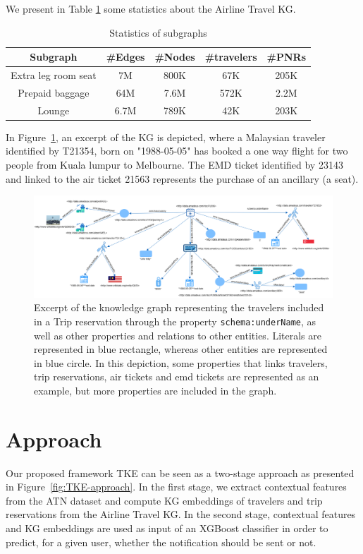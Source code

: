 \documentclass[11pt,dvipdfm]{article}
\begin{document}
We present in Table \ref{tab:subgraphs} some statistics about the Airline Travel KG. 
\begin{table}[htbp]
  \centering
  \caption{Statistics of subgraphs}
  \label{tab:subgraphs}
  \footnotesize
  \begin{tabular}{|c|c|c|c|c|}
    \hline
    Subgraph & \#Edges & \#Nodes & \#travelers & \#PNRs\\
    \hline
    Extra leg room seat & 7M & 800K & 67K & 205K \\
    \hline
    Prepaid baggage & 64M & 7.6M & 572K & 2.2M \\
    \hline
    Lounge & 6.7M & 789K & 42K & 203K \\
  \hline
\end{tabular}
\end{table}
In Figure~\ref{fig:kg}, an excerpt of the KG is depicted, where a Malaysian traveler identified by T21354, born on "1988-05-05" has booked a one way flight for two people from Kuala lumpur to Melbourne. The EMD ticket identified by 23143 and linked to the air ticket 21563 represents the purchase of an ancillary (a seat).
\begin{figure}[hbt!]
  \centering
  \includegraphics[width=\linewidth, height=6.5 cm]{figs/Airline_Travel_KG.png}
  \caption{Excerpt of the knowledge graph representing the travelers included in a Trip reservation through the property \texttt{schema:underName}, as well as other properties and relations to other entities. Literals are represented in blue rectangle, whereas other entities are represented in blue circle. In this depiction, some properties that links travelers, trip reservations, air tickets and emd tickets are represented as an example, but more properties are included in the graph.}
  \label{fig:kg}
\end{figure}

\section{Approach}
\label{sec:approach}
Our proposed framework TKE can be seen as a two-stage approach as presented in Figure~\ref{fig:TKE-approach}. In the first stage, we extract contextual features from the ATN dataset and compute KG embeddings of travelers and trip reservations from the Airline Travel KG. In the second stage, contextual features and KG embeddings are used as input of an XGBoost classifier in order to predict, for a given user, whether the notification should be sent or not.
\end{document}
